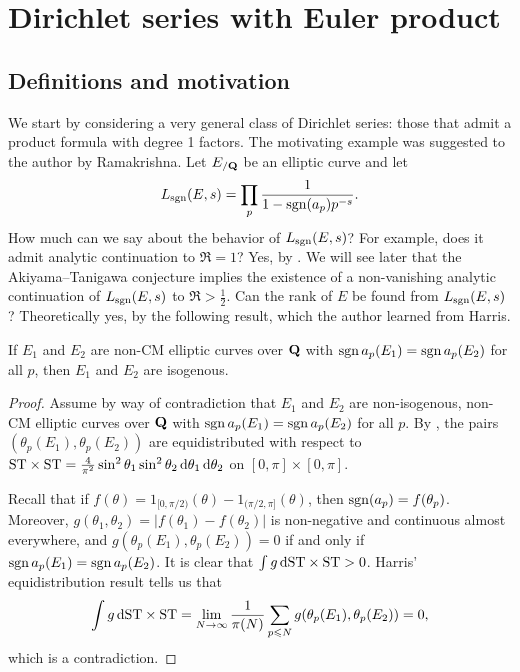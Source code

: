 
\chapter{Dirichlet series with Euler product}\label{ch:Dirichlet-series}





\section{Definitions and motivation}

We start by considering a very general class of Dirichlet series: those that 
admit a product formula with degree 1 factors. The motivating example was 
suggested to the author by Ramakrishna. Let $E_{/\mathbf{Q}}$ be an elliptic 
curve and let 
\[
	L_{\operatorname{sgn}}(E,s) = \prod_p \frac{1}{1-\operatorname{sgn}(a_p) p^{-s}} .
\]
How much can we say about the behavior of $L_{\operatorname{sgn}}(E,s)$? For example, does it 
admit analytic continuation to $\Re = 1$? Yes, by 
\cite[A.2]{serre-1989}. We will see later that the Akiyama--Tanigawa 
conjecture implies the existence of a non-vanishing analytic continuation of 
$L_{\operatorname{sgn}}(E,s)$ to $\Re > \frac 1 2$. Can the rank of $E$ be 
found from $L_{\operatorname{sgn}}(E,s)$? Theoretically yes, by the following result, which 
the author learned from Harris. 

\begin{theorem}
If $E_1$ and $E_2$ are non-CM elliptic curves over $\mathbf{Q}$ with 
$\operatorname{sgn} a_p(E_1) = \operatorname{sgn} a_p(E_2)$ for all $p$, then $E_1$ and $E_2$ are 
isogenous.
\end{theorem}
\begin{proof}
Assume by way of contradiction that $E_1$ and $E_2$ are non-isogenous, non-CM 
elliptic curves over $\mathbf{Q}$ with $\operatorname{sgn} a_p(E_1) = \operatorname{sgn} a_p(E_2)$ for all $p$. By 
\cite[5.4]{harris-2009}, the pairs $(\theta_p(E_1),\theta_p(E_2))$ are 
equidistributed with respect to 
$\mathrm{ST}\times \mathrm{ST} = \frac{4}{\pi^2} \sin^2\theta_1\sin^2\theta_2\, \mathrm{d}\theta_1\, \mathrm{d}\theta_2$ 
on $[0,\pi]\times [0,\pi]$. 

Recall that if $f(\theta) = 1_{[0,\pi/2)}(\theta) - 1_{(\pi/2,\pi]}(\theta)$, 
then $\operatorname{sgn}(a_p) = f(\theta_p)$. Moreover, 
$g(\theta_1,\theta_2) = |f(\theta_1) - f(\theta_2)|$ is non-negative and 
continuous almost everywhere, and $g(\theta_p(E_1),\theta_p(E_2)) = 0$ if and 
only if $\operatorname{sgn} a_p(E_1) = \operatorname{sgn} a_p(E_2)$. It is clear that 
$\int g\, \mathrm{d} \mathrm{ST}\times \mathrm{ST} > 0$. Harris' equidistribution result tells us that 
\[
	\int g\, \mathrm{d} \mathrm{ST}\times\mathrm{ST} = \lim_{N\to \infty} \frac{1}{\pi(N)} \sum_{p\leqslant N} g(\theta_p(E_1),\theta_p(E_2)) = 0 ,
\]
which is a contradiction. 
\end{proof}

